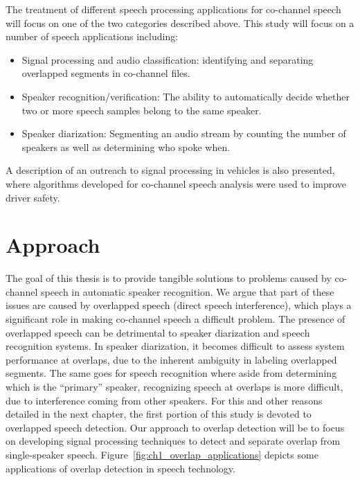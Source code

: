 The treatment of different speech processing applications for co-channel speech will focus on one of the two categories described above. 
This study will focus on a number of speech applications including: 
\begin{itemize}
	\item Signal processing and audio classification: identifying and separating overlapped segments in co-channel files. 
	\item Speaker recognition/verification: The ability to automatically decide whether two or more speech samples belong to the same speaker. 
	\item Speaker diarization: Segmenting an audio stream by counting the number of speakers as well as determining who spoke when. 
\end{itemize}

A description of an outreach to signal processing in vehicles is also presented, where algorithms developed for co-channel speech analysis were used to improve driver safety. 

\section{Approach}

The goal of this thesis is to provide tangible solutions to problems caused by co-channel speech in automatic speaker recognition. 
We argue that part of these issues are caused by overlapped speech (direct speech interference), which plays a significant role in making co-channel speech a difficult problem. 
The presence of overlapped speech can be detrimental to speaker diarization and speech recognition systems. 
In speaker diarization, it becomes difficult to assess system performance at overlaps, due to the inherent ambiguity in labeling overlapped segments. 
The same goes for speech recognition where aside from determining which is the ``primary'' speaker, recognizing speech at overlaps is more difficult, due to interference coming from other speakers. 
For this and other reasons detailed in the next chapter, the first portion of this study is devoted to overlapped speech detection. 
Our approach to overlap detection will be to focus on developing signal processing techniques to detect and separate overlap from single-speaker speech. Figure~\ref{fig:ch1_overlap_applications} depicts some applications of overlap detection in speech technology. 

